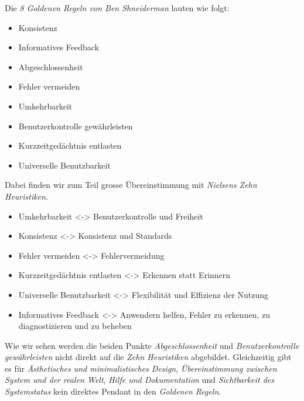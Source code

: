 Die \textit{8 Goldenen Regeln von Ben Shneiderman} lauten wie folgt:
\begin{itemize}
  \item Konsistenz
  \item Informatives Feedback
  \item Abgeschlossenheit
  \item Fehler vermeiden
  \item Umkehrbarkeit
  \item Benutzerkontrolle gewährleisten
  \item Kurzzeitgedächtnis entlasten
  \item Universelle Benutzbarkeit
\end{itemize}

Dabei finden wir zum Teil grosse Übereinstimmung mit \textit{Nielsens Zehn
Heuristiken}. 

\begin{itemize}
  \item Umkehrbarkeit <-> Benutzerkontrolle und Freiheit
  \item Konsistenz <-> Konsistenz und Standards
  \item Fehler vermeiden <-> Fehlervermeidung 
  \item Kurzzeitgedächtnis entlasten <-> Erkennen statt Erinnern
  \item Universelle Benutzbarkeit <-> Flexibilität und Effizienz der Nutzung
  \item Informatives Feedback <-> Anwendern helfen, Fehler zu erkennen, zu diagnostizieren und zu beheben
\end{itemize}

Wie wir sehen werden die beiden Punkte \textit{Abgeschlossenheit} und
\textit{Benutzerkontrolle gewährleisten} nicht direkt auf die \textit{Zehn
Heuristiken} abgebildet. Gleichzeitig gibt es für \textit{Ästhetisches und
minimalistisches Design}, \textit{Übereinstimmung zwischen System und der
realen Welt}, \textit{Hilfe und Dokumentation} und \textit{Sichtbarkeit des
Systemstatus} kein direktes Pendant in den \textit{Goldenen Regeln}. 
